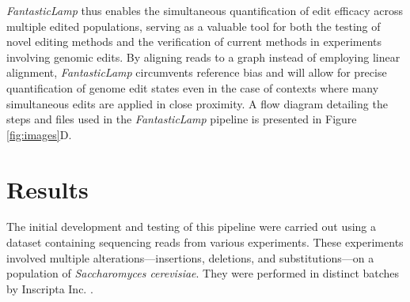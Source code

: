 \documentclass{bioinfo}
\theoremstyle{definition}
\begin{document}
\textit{FantasticLamp} thus enables the simultaneous quantification of edit efficacy across multiple edited populations, serving as a valuable tool for both the testing of novel editing methods and the verification of current methods in experiments involving genomic edits.
By aligning reads to a graph instead of employing linear alignment, \textit{FantasticLamp} circumvents reference bias and will allow for precise quantification of genome edit states even in the case of contexts where many simultaneous edits are applied in close proximity.
A flow diagram detailing the steps and files used in the \textit{FantasticLamp} pipeline is presented in Figure \ref{fig:images}D.



\section*{Results}
\label{sec:results}

The initial development and testing of this pipeline were carried out using a dataset containing sequencing reads from various experiments.
These experiments involved multiple alterations---insertions, deletions, and substitutions---on a population of \textit{Saccharomyces cerevisiae}.
They were performed in distinct batches by Inscripta Inc. \citep{gander2021simultaneous}.
\end{document}
